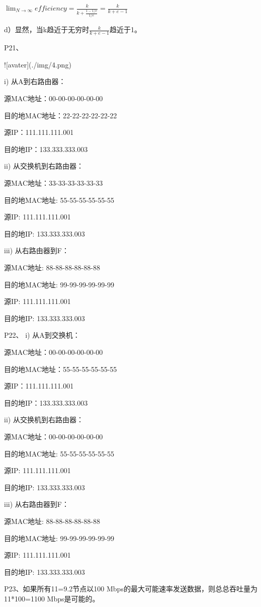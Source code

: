 \documentclass[11pt,UTF8,twoside]{article}
\begin{document}
{		$\lim_{N \to\infty } efficiency =\frac{k}{k+\frac{1-1/e}{1/e}}=\frac{k}{k+e-1}$
		
		d）显然，当k趋近于无穷时$\frac{k}{k+e-1}$趋近于1。
		
		P21、
		
		![avater](./img/4.png)
		
		i) 从A到右路由器：
		
		源MAC地址：00-00-00-00-00-00 
		
		目的地MAC地址：22-22-22-22-22-22 
		
		源IP：111.111.111.001 
		
		目的地IP：133.333.333.003 
		
		ii) 从交换机到右路由器：
		
		源MAC地址：33-33-33-33-33-33
		
		目的地MAC地址: 55-55-55-55-55-55 
		
		源IP: 111.111.111.001 
		
		目的地IP: 133.333.333.003 
		
		iii) 从右路由器到F：
		
		源MAC地址: 88-88-88-88-88-88 
		
		目的地MAC地址: 99-99-99-99-99-99 
		
		源IP: 111.111.111.001 
		
		目的地IP: 133.333.333.003
		
		
		P22、
		i) 从A到交换机：
		
		源MAC地址：00-00-00-00-00-00 
		
		目的地MAC地址：55-55-55-55-55-55 
		
		源IP：111.111.111.001 
		
		目的地IP：133.333.333.003 
		
		ii) 从交换机到右路由器：
		
		源MAC地址：00-00-00-00-00-00
		
		目的地MAC地址: 55-55-55-55-55-55 
		
		源IP: 111.111.111.001 
		
		目的地IP: 133.333.333.003 
		
		iii) 从右路由器到F：
		
		源MAC地址: 88-88-88-88-88-88 
		
		目的地MAC地址: 99-99-99-99-99-99 
		
		源IP: 111.111.111.001 
		
		目的地IP: 133.333.333.003 
		
		
		P23、如果所有11=9.2节点以100 Mbps的最大可能速率发送数据，则总总吞吐量为11*100=1100 Mbps是可能的。
		
}
\end{document}
